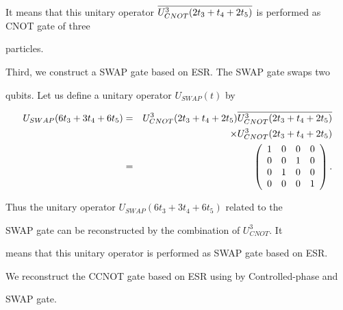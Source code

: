 It means that this unitary operator $\overline{%

U_{CNOT}^{3}(2t_{3}+t_{4}+2t_{5})}$ is performed as CNOT gate of three

particles.



Third, we construct a SWAP gate based on ESR. The SWAP gate swaps two

qubits. Let us define a unitary operator $U_{SWAP}(t)$ by%

\begin{eqnarray*}

U_{SWAP}(6t_{3}+3t_{4}+6t_{5}) &=&U_{CNOT}^{3}(2t_{3}+t_{4}+2t_{5})\overline{%

U_{CNOT}^{3}(2t_{3}+t_{4}+2t_{5})} \\

&&\times U_{CNOT}^{3}(2t_{3}+t_{4}+2t_{5}) \\

&=&\left( 

\begin{array}{llll}

1 & 0 & 0 & 0 \\ 

0 & 0 & 1 & 0 \\ 

0 & 1 & 0 & 0 \\ 

0 & 0 & 0 & 1%

\end{array}%

\right) .

\end{eqnarray*}

Thus the unitary operator $U_{SWAP}(6t_{3}+3t_{4}+6t_{5})$ related to the

SWAP gate can be reconstructed by the combination of $U_{CNOT}^{3}$. It

means that this unitary operator is performed as SWAP gate based on ESR.











We reconstruct the CCNOT gate based on ESR using by Controlled-phase and

SWAP gate.%





